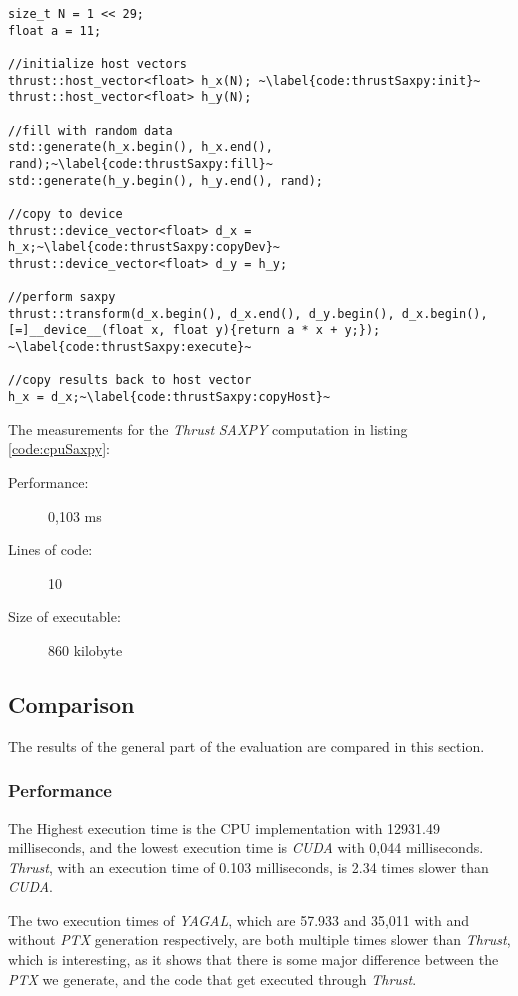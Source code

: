 \begin{lstlisting}[caption={\textit{Thrust} \textit{SAXPY} example.}, label={code:thrustSaxpy}]
size_t N = 1 << 29;
float a = 11;

//initialize host vectors
thrust::host_vector<float> h_x(N); ~\label{code:thrustSaxpy:init}~
thrust::host_vector<float> h_y(N);

//fill with random data
std::generate(h_x.begin(), h_x.end(), rand);~\label{code:thrustSaxpy:fill}~
std::generate(h_y.begin(), h_y.end(), rand);

//copy to device
thrust::device_vector<float> d_x = h_x;~\label{code:thrustSaxpy:copyDev}~
thrust::device_vector<float> d_y = h_y;

//perform saxpy
thrust::transform(d_x.begin(), d_x.end(), d_y.begin(), d_x.begin(), [=]__device__(float x, float y){return a * x + y;}); ~\label{code:thrustSaxpy:execute}~

//copy results back to host vector
h_x = d_x;~\label{code:thrustSaxpy:copyHost}~
\end{lstlisting}

The measurements for the \textit{Thrust} \textit{SAXPY} computation in listing \ref{code:cpuSaxpy}:
\begin{description}
    \item[Performance:] 0,103 ms
    \item[Lines of code:] 10 
    \item[Size of executable:] 860 kilobyte
\end{description}

\subsection{Comparison}
The results of the general part of the evaluation are compared in this section.

\subsubsection[*]{Performance}
The Highest execution time is the CPU implementation with 12931.49 milliseconds, and the lowest execution time is \textit{CUDA} with 0,044 milliseconds. \textit{Thrust}, with an execution time of 0.103 milliseconds, is 2.34 times slower than \textit{CUDA}.

The two execution times of \textit{YAGAL}, which are 57.933 and 35,011 with and without \textit{PTX} generation respectively, are both multiple times slower than \textit{Thrust}, which is interesting, as it shows that there is some major difference between the \textit{PTX} we generate, and the code that get executed through \textit{Thrust}.

